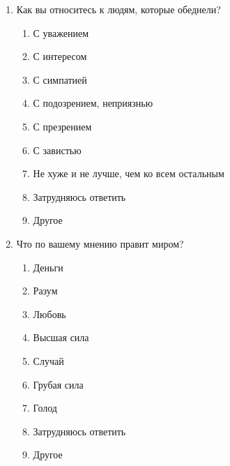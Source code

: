 \begin{enumerate}
    \item Как вы относитесь к людям, которые обеднели?
    \begin{enumerate}
        \item[\dline] С уважением
        \item[\dline] С интересом
        \item[\dline] С симпатией
        \item[\dline] С подозрением, неприязнью
        \item[\dline] С презрением
        \item[\dline] С завистью
        \item[\dline] Не хуже и не лучше, чем ко всем остальным
        \item[\dline] Затрудняюсь ответить
        \item[] Другое \hugeline 
    \end{enumerate}

    \item Что по вашему мнению правит миром?
    \begin{enumerate}
        \item[\dline] Деньги
        \item[\dline] Разум
        \item[\dline] Любовь
        \item[\dline] Высшая сила
        \item[\dline] Случай
        \item[\dline] Грубая сила
        \item[\dline] Голод
        \item[\dline] Затрудняюсь ответить
        \item[] Другое \hugeline 
    \end{enumerate}


\end{enumerate}
